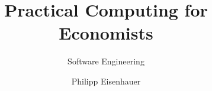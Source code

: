 \title{Practical Computing for Economists}
\subtitle{Software Engineering}
\author{Philipp Eisenhauer}
\date{}
